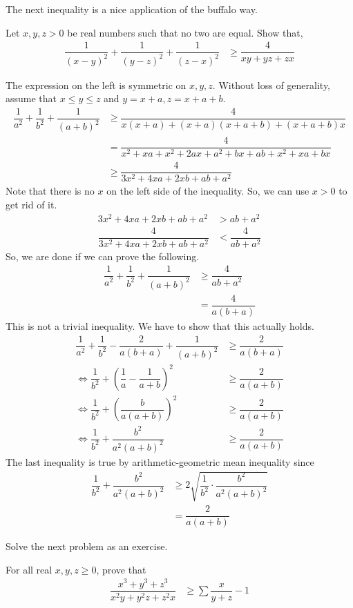 \documentclass{subfile}
\begin{document}
	The next inequality is a nice application of the buffalo way.
		\begin{problem}
			Let $x,y,z>0$ be real numbers such that no two are equal. Show that,
				\begin{align*}
					\dfrac{1}{(x-y)^2}+\dfrac{1}{(y-z)^2}+\dfrac{1}{(z-x)^2}
						& \geq\dfrac{4}{xy+yz+zx}
				\end{align*}
		\end{problem}
	
		\begin{solution}
			The expression on the left is symmetric on $x,y,z$. Without loss of generality, assume that $x\leq y\leq z$ and $y=x+a,z=x+a+b$.
				\begin{align*}
					\dfrac{1}{a^2}+\dfrac{1}{b^2}+\dfrac{1}{(a+b)^2}
						& \geq\dfrac{4}{x(x+a)+(x+a)(x+a+b)+(x+a+b)x}\\
						& = \dfrac{4}{x^2+xa+x^2+2ax+a^2+bx+ab+x^2+xa+bx}\\
						& \geq \dfrac{4}{3x^2+4xa+2xb+ab+a^2}
				\end{align*}
			Note that there is no $x$ on the left side of the inequality. So, we can use $x>0$ to get rid of it.
				\begin{align*}
					3x^2+4xa+2xb+ab+a^2
						& > ab+a^2\\
					\dfrac{4}{3x^2+4xa+2xb+ab+a^2}
						& <\dfrac{4}{ab+a^2}
				\end{align*}
			So, we are done if we can prove the following.
				\begin{align*}
					\dfrac{1}{a^2}+\dfrac{1}{b^2}+\dfrac{1}{(a+b)^2}
						& \geq\dfrac{4}{ab+a^2}\\
						& = \dfrac{4}{a(b+a)}
				\end{align*}
			This is not a trivial inequality. We have to show that this actually holds.
				\begin{align*}
					\dfrac{1}{a^2}+\dfrac{1}{b^2}-\dfrac{2}{a(b+a)}+\dfrac{1}{(a+b)^2}
						& \geq\dfrac{2}{a(b+a)}\\
					\iff\dfrac{1}{b^2}+\left(\dfrac{1}{a}-\dfrac{1}{a+b}\right)^2
						& \geq\dfrac{2}{a(a+b)}\\
					\iff\dfrac{1}{b^2}+\left(\dfrac{b}{a(a+b)}\right)^2
						& \geq\dfrac{2}{a(a+b)}\\
					\iff\dfrac{1}{b^2}+\dfrac{b^2}{a^2(a+b)^2}
						& \geq\dfrac{2}{a(a+b)}
				\end{align*}
			The last inequality is true by arithmetic-geometric mean inequality since
				\begin{align*}
					\dfrac{1}{b^2}+\dfrac{b^2}{a^2(a+b)^2}
						& \geq2\sqrt{\dfrac{1}{b^2}\cdot\dfrac{b^2}{a^2(a+b)^2}}\\
						& = \dfrac{2}{a(a+b)}
				\end{align*}
		\end{solution}
	Solve the next problem as an exercise.
		\begin{problem}
			For all real $x,y,z\geq0$, prove that
				\begin{align*}
					\dfrac{x^3+y^3+z^3}{x^2y+y^2z+z^2x}
						& \geq\sum\dfrac{x}{y+z}-1
				\end{align*}
		\end{problem}
\end{document}

